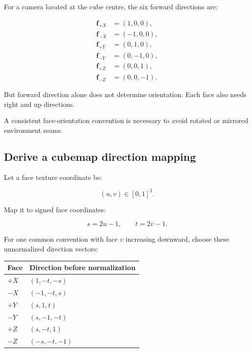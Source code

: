 \hypertarget{02-foundations-ii-ch035-construct-six-camera-directions}{}

For a camera located at the cube centre, the six forward directions are:

\[ \begin{aligned} \mathbf f_{+X}&=(1,0,0),\\ \mathbf f_{-X}&=(-1,0,0),\\ \mathbf f_{+Y}&=(0,1,0),\\ \mathbf f_{-Y}&=(0,-1,0),\\ \mathbf f_{+Z}&=(0,0,1),\\ \mathbf f_{-Z}&=(0,0,-1). \end{aligned} \]

But forward direction alone does not determine orientation. Each face also needs right and up directions.

A consistent face-orientation convention is necessary to avoid rotated or mirrored environment seams.

\subsection{Derive a cubemap direction mapping}\label{02-foundations-ii-ch035-derive-a-cubemap-direction-mapping}

\hypertarget{02-foundations-ii-ch035-derive-a-cubemap-direction-mapping}{}

Let a face texture coordinate be:

\[ (u,v)\in[0,1]^2. \]

Map it to signed face coordinates:

\[ s=2u-1, \qquad t=2v-1. \]

For one common convention with face \(v\) increasing downward, choose these unnormalized direction vectors:

{\def\LTcaptype{none} %
\begin{longtable}[]{@{}ll@{}}
\toprule\noalign{}
Face & Direction before normalization \\
\midrule\noalign{}
\endhead
\bottomrule\noalign{}
\endlastfoot
\(+X\) & \((1,-t,-s)\) \\
\(-X\) & \((-1,-t,s)\) \\
\(+Y\) & \((s,1,t)\) \\
\(-Y\) & \((s,-1,-t)\) \\
\(+Z\) & \((s,-t,1)\) \\
\(-Z\) & \((-s,-t,-1)\) \\
\end{longtable}
}

